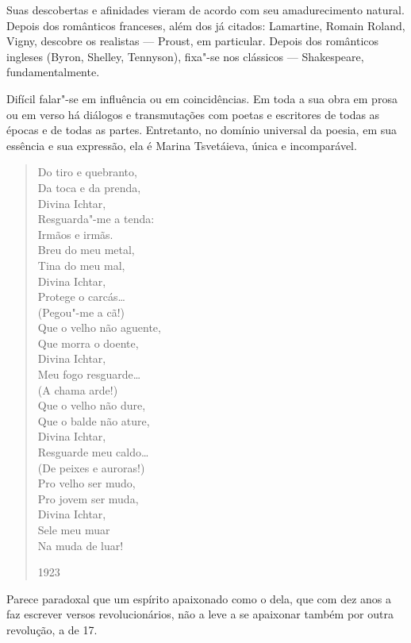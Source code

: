 Suas descobertas e afinidades vieram de acordo com seu amadurecimento
natural. Depois dos românticos franceses, além dos já citados:
Lamartine, Romain Roland, Vigny, descobre os realistas --- Proust, em
particular. Depois dos românticos ingleses (Byron, Shelley, Tennyson),
fixa"-se nos clássicos --- Shakespeare, fundamentalmente.

Difícil falar"-se em influência ou em coincidências. Em toda a sua obra
em prosa ou em verso há diálogos e transmutações com poetas e escritores
de todas as épocas e de todas as partes. Entretanto, no domínio
universal da poesia, em sua essência e sua expressão, ela é Marina
Tsvetáieva, única e incomparável.

\begin{verse}
Do tiro e quebranto, \\
Da toca e da prenda, \\
Divina Ichtar, \\
Resguarda"-me a tenda: \\[8pt]
Irmãos e irmãs. \\
Breu do meu metal, \\
Tina do meu mal, \\
Divina Ichtar, \\
Protege o carcás\ldots{} \\[8pt]
(Pegou"-me a cã!) \\[8pt]
Que o velho não aguente, \\
Que morra o doente, \\
Divina Ichtar, \\
Meu fogo resguarde\ldots{} \\[8pt]
(A chama arde!) \\[8pt]
Que o velho não dure, \\
Que o balde não ature, \\
Divina Ichtar, \\
Resguarde meu caldo\ldots{} \\[8pt]
(De peixes e auroras!) \\[8pt]
Pro velho ser mudo, \\
Pro jovem ser muda, \\
Divina Ichtar, \\
Sele meu muar \\
Na muda de luar!
\begin{flushright}
1923
\end{flushright}
\end{verse}

Parece paradoxal que um espírito apaixonado como o dela, que com dez
anos a faz escrever versos revolucionários, não a leve a se apaixonar
também por outra revolução, a de 17.

